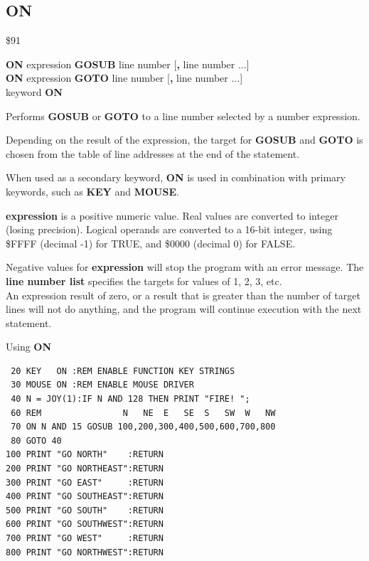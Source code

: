\subsection{ON}
\begin{description}[leftmargin=2cm,style=nextline]
\item [Token:] \$91
\item [Format:] {\bf ON} expression {\bf GOSUB} line number [{\bf,} line number ...] \\
                {\bf ON} expression {\bf GOTO} line number [{\bf,} line number ...] \\
                keyword {\bf ON}
\item [Usage:]  Performs {\bf GOSUB} or {\bf GOTO} to a line number selected
                by a number expression.

                Depending on the result of the expression, the target
                for {\bf GOSUB} and {\bf GOTO} is chosen from
                the table of line addresses at the end of the statement.

                When used as a secondary keyword, {\bf ON} is used in
                combination with primary keywords, such as
                {\bf KEY} and {\bf MOUSE}.

                {\bf expression} is a positive numeric value.
                Real values are converted to integer (losing precision).
                Logical operands are converted to a 16-bit integer,
                using \$FFFF (decimal -1) for TRUE,
                and \$0000 (decimal 0) for FALSE.

\item [Remarks:] Negative values for {\bf expression} will stop
                 the program with an error message.
                 The {\bf line number list} specifies the targets for values
                 of 1, 2, 3, etc. \\
                 An expression result of zero, or a result that is greater
                 than the number of target lines will not do anything, and the
                 program will continue execution with the next statement.

\newpage
\item [Example:] Using {\bf ON}
\begin{tcolorbox}[colback=black,coltext=white]
\verbatimfont{\codefont}
\begin{verbatim}
 20 KEY   ON :REM ENABLE FUNCTION KEY STRINGS
 30 MOUSE ON :REM ENABLE MOUSE DRIVER
 40 N = JOY(1):IF N AND 128 THEN PRINT "FIRE! ";
 60 REM                N   NE  E   SE  S   SW  W   NW
 70 ON N AND 15 GOSUB 100,200,300,400,500,600,700,800
 80 GOTO 40
100 PRINT "GO NORTH"    :RETURN
200 PRINT "GO NORTHEAST":RETURN
300 PRINT "GO EAST"     :RETURN
400 PRINT "GO SOUTHEAST":RETURN
500 PRINT "GO SOUTH"    :RETURN
600 PRINT "GO SOUTHWEST":RETURN
700 PRINT "GO WEST"     :RETURN
800 PRINT "GO NORTHWEST":RETURN
\end{verbatim}
\end{tcolorbox}
\end{description}

